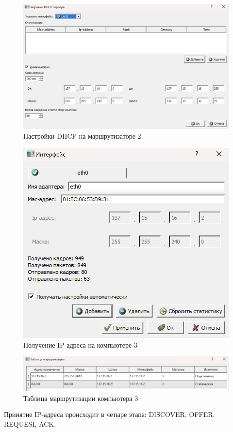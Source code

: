 \documentclass[12pt,onecolumn]{article}
\begin{document}
\begin{figure}[H]
    \centering
    \includegraphics[width=\textwidth]{image/part-4/router2-dhcp-settings.png}
    \caption{Настройки DHCP на маршрутизаторе 2}
\end{figure}

\begin{figure}[H]
    \centering
    \includegraphics[width=\textwidth]{image/part-4/couputer3-ip.png}
    \caption{Получение IP-адреса на компьютере 3}
\end{figure}
\begin{figure}[H]
    \centering
    \includegraphics[width=\textwidth]{image/part-4/computer3-routing.png}
    \caption{Таблица маршрутизации компьютера 3}
\end{figure}
Принятие IP-адреса происходит в четыре этапа: DISCOVER, OFFER, REQUESI, ACK.
\end{document}
